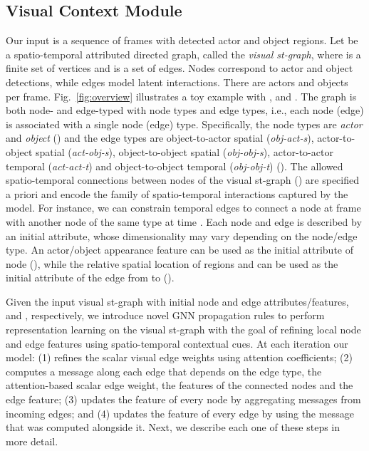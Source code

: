 \documentclass[runningheads]{llncs}
\begin{document}
\subsection{Visual Context Module}
\label{subsec:visual_context}
 Our 
input is a sequence of  frames with detected actor and object regions. Let  be a spatio-temporal attributed directed 
graph, called the 
\emph{visual st-graph}, where  is a finite set 
of vertices and  is a set of edges. Nodes correspond to actor and object detections, while edges model latent interactions. There are  actors and  objects per frame. Fig.~\ref{fig:overview} illustrates a toy example with ,  and .
The graph is both node- and edge-typed
with  node types and  edge types, i.e., each node (edge) is associated with a single node (edge) type. Specifically, the node types are
\emph{actor} and \emph{object} () and the edge types are object-to-actor spatial (\emph{obj-act-s}), actor-to-object spatial (\emph{act-obj-s}), object-to-object spatial (\emph{obj-obj-s}), actor-to-actor temporal (\emph{act-act-t}) and object-to-object temporal (\emph{obj-obj-t})  (). The allowed spatio-temporal connections between nodes of the visual st-graph () are specified a priori and encode the family of spatio-temporal interactions captured by the model. For instance, we can constrain temporal edges to connect a node 
at frame  with another node of the same type at time .
Each node and edge is described by an initial attribute, whose dimensionality may vary depending on the node/edge type. An actor/object appearance feature can be used as the initial attribute of node  (), while the relative spatial location of regions  and  can be used as the initial attribute of the edge from  to  ().


Given the input visual st-graph  with initial node and edge attributes/features,  and ,
respectively, we introduce novel GNN propagation rules to perform representation learning on the visual st-graph with the goal of refining local node and edge features using spatio-temporal contextual cues.
At each iteration our model: (1) refines the scalar visual edge weights using attention coefficients;
(2) computes a message along each edge that depends on the edge type, the attention-based  scalar edge weight, the features of the connected nodes and the edge feature; (3) updates the feature of every node by aggregating messages from incoming edges; and (4) updates the feature of every edge by using the message that was computed alongside it. Next, we describe each one of these steps in more detail.
\end{document}
